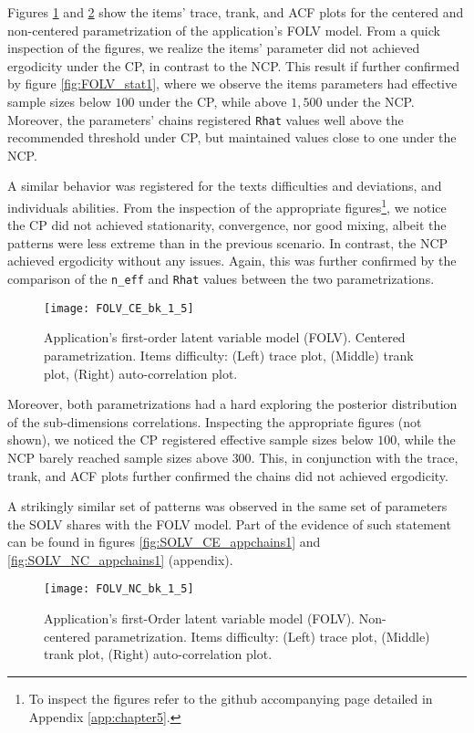 Figures \ref{fig:FOLV_CE_chains1} and \ref{fig:FOLV_NC_chains1} show the items' trace, trank, and ACF plots for the centered and non-centered parametrization of the application's FOLV model. From a quick inspection of the figures, we realize the items' parameter did not achieved ergodicity under the CP, in contrast to the NCP. This result if further confirmed by figure \ref{fig:FOLV_stat1}, where we observe the items parameters had effective sample sizes below $100$ under the CP, while above $1,500$ under the NCP. Moreover, the parameters' chains registered \texttt{Rhat} values well above the recommended threshold under CP, but maintained values close to one under the NCP.

A similar behavior was registered for the texts difficulties and deviations, and individuals abilities. From the inspection of the appropriate figures\footnote{To inspect the figures refer to the github accompanying page detailed in Appendix \ref{app:chapter5}.}, we notice the CP did not achieved stationarity, convergence, nor good mixing, albeit the patterns were less extreme than in the previous scenario. In contrast, the NCP achieved ergodicity without any issues. Again, this was further confirmed by the comparison of the \texttt{n\_eff} and \texttt{Rhat} values between the two parametrizations.
%
\begin{figure}[H]
	\centering
	\texttt{[image: FOLV\_CE\_bk\_1\_5]}
	\caption[Application's first-order latent variable model (FOLV). Centered parametrization. Items difficulty. Trace, trank and auto-correlation plots.]%
	{Application's first-order latent variable model (FOLV). Centered parametrization. Items difficulty: (Left) trace plot, (Middle) trank plot, (Right) auto-correlation plot.}
	\label{fig:FOLV_CE_chains1}
\end{figure}

Moreover, both parametrizations had a hard exploring the posterior distribution of the sub-dimensions correlations. Inspecting the appropriate figures (not shown), we noticed the CP registered effective sample sizes below $100$, while the NCP barely reached sample sizes above $300$. This, in conjunction with the trace, trank, and ACF plots further confirmed the chains did not achieved ergodicity.

A strikingly similar set of patterns was observed in the same set of parameters the SOLV shares with the FOLV model. Part of the evidence of such statement can be found in figures \ref{fig:SOLV_CE_appchains1} and \ref{fig:SOLV_NC_appchains1} (appendix).
%
\begin{figure}[H]
	\centering
	\texttt{[image: FOLV\_NC\_bk\_1\_5]}
	\caption[Application's first-order latent variable model (FOLV). Non-centered parametrization. Items difficulty. Trace, trank and auto-correlation plots.]%
	{Application's first-Order latent variable model (FOLV). Non-centered parametrization. Items difficulty: (Left) trace plot, (Middle) trank plot, (Right) auto-correlation plot.}
	\label{fig:FOLV_NC_chains1}
\end{figure}

